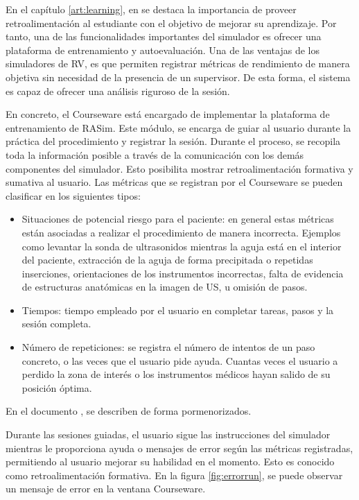 En el capítulo \ref{art:learning}, en \cite{ericsson1993role} se destaca la importancia de proveer retroalimentación al estudiante con el objetivo de mejorar su aprendizaje. Por tanto, una de las funcionalidades importantes del simulador es ofrecer una plataforma de entrenamiento y autoevaluación. Una de las ventajas de los simuladores de \ac{RV}, es que permiten registrar métricas de rendimiento de manera objetiva sin necesidad de la presencia de un supervisor. De esta forma, el sistema es capaz de ofrecer una análisis riguroso de la sesión.

En concreto, el  \ac{Courseware} está encargado de implementar la plataforma de entrenamiento de \ac{RASim}. Este módulo, se encarga de guiar al usuario durante la práctica del procedimiento y registrar la sesión. Durante el proceso, se recopila toda la información posible a través de la comunicación con los demás componentes del simulador. Esto posibilita mostrar retroalimentación formativa y sumativa al usuario. Las métricas que se registran por el \ac{Courseware} se pueden clasificar en los siguientes tipos:

\begin{itemize}
    \item Situaciones de potencial riesgo para el paciente: en general estas métricas están asociadas a realizar el procedimiento de manera incorrecta. Ejemplos como levantar la sonda de ultrasonidos mientras la aguja está en el interior del paciente, extracción de la aguja de forma precipitada o repetidas inserciones, orientaciones de los instrumentos incorrectas, falta de evidencia de estructuras anatómicas en la imagen de \ac{US}, u omisión de pasos. 
    
    \item Tiempos: tiempo empleado por el usuario en completar tareas, pasos y la sesión completa. 
    
    \item Número de repeticiones: se registra el número de intentos de un paso concreto, o las veces que el usuario pide ayuda. Cuantas veces el usuario a perdido la zona de interés o los instrumentos médicos hayan salido de su posición óptima.
\end{itemize}

En el documento \cite{ded4.4}, se describen de forma pormenorizados.

Durante las sesiones guiadas, el usuario sigue las instrucciones del simulador mientras le proporciona ayuda o mensajes de error según las métricas registradas, permitiendo al usuario mejorar su habilidad en el momento. Esto es conocido como retroalimentación formativa. En la figura \ref{fig:errorrun}, se puede observar un mensaje de error en la ventana \ac{Courseware}.



